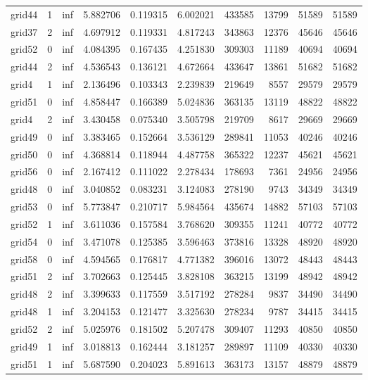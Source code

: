 \begin{longtable}{|l|r|r|r|r|r|r|r|r|r|}
grid44 & 1 & inf & 5.882706 & 0.119315 & 6.002021 & 433585 & 13799 & 51589 & 51589 \\
grid37 & 2 & inf & 4.697912 & 0.119331 & 4.817243 & 343863 & 12376 & 45646 & 45646 \\
grid52 & 0 & inf & 4.084395 & 0.167435 & 4.251830 & 309303 & 11189 & 40694 & 40694 \\
grid44 & 2 & inf & 4.536543 & 0.136121 & 4.672664 & 433647 & 13861 & 51682 & 51682 \\
grid4 & 1 & inf & 2.136496 & 0.103343 & 2.239839 & 219649 & 8557 & 29579 & 29579 \\
grid51 & 0 & inf & 4.858447 & 0.166389 & 5.024836 & 363135 & 13119 & 48822 & 48822 \\
grid4 & 2 & inf & 3.430458 & 0.075340 & 3.505798 & 219709 & 8617 & 29669 & 29669 \\
grid49 & 0 & inf & 3.383465 & 0.152664 & 3.536129 & 289841 & 11053 & 40246 & 40246 \\
grid50 & 0 & inf & 4.368814 & 0.118944 & 4.487758 & 365322 & 12237 & 45621 & 45621 \\
grid56 & 0 & inf & 2.167412 & 0.111022 & 2.278434 & 178693 & 7361 & 24956 & 24956 \\
grid48 & 0 & inf & 3.040852 & 0.083231 & 3.124083 & 278190 & 9743 & 34349 & 34349 \\
grid53 & 0 & inf & 5.773847 & 0.210717 & 5.984564 & 435674 & 14882 & 57103 & 57103 \\
grid52 & 1 & inf & 3.611036 & 0.157584 & 3.768620 & 309355 & 11241 & 40772 & 40772 \\
grid54 & 0 & inf & 3.471078 & 0.125385 & 3.596463 & 373816 & 13328 & 48920 & 48920 \\
grid58 & 0 & inf & 4.594565 & 0.176817 & 4.771382 & 396016 & 13072 & 48443 & 48443 \\
grid51 & 2 & inf & 3.702663 & 0.125445 & 3.828108 & 363215 & 13199 & 48942 & 48942 \\
grid48 & 2 & inf & 3.399633 & 0.117559 & 3.517192 & 278284 & 9837 & 34490 & 34490 \\
grid48 & 1 & inf & 3.204153 & 0.121477 & 3.325630 & 278234 & 9787 & 34415 & 34415 \\
grid52 & 2 & inf & 5.025976 & 0.181502 & 5.207478 & 309407 & 11293 & 40850 & 40850 \\
grid49 & 1 & inf & 3.018813 & 0.162444 & 3.181257 & 289897 & 11109 & 40330 & 40330 \\
grid51 & 1 & inf & 5.687590 & 0.204023 & 5.891613 & 363173 & 13157 & 48879 & 48879 \\

\end{longtable}
